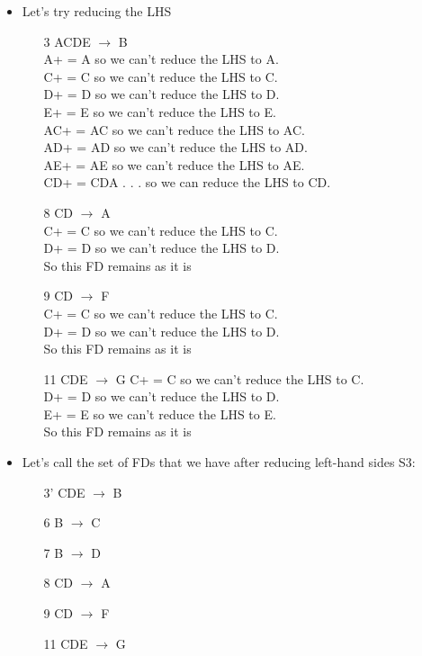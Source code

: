 \documentclass{article}
\begin{document}
\begin{enumerate}
\begin{enumerate}
\begin{itemize}
\item %
Let's try reducing the LHS
\begin{enumerate} 
\item[3] ACDE $\rightarrow$ B \\
A+ = A so we can't reduce the LHS to A. \\
C+ = C so we can't reduce the LHS to C. \\
D+ = D so we can't reduce the LHS to D. \\
E+ = E so we can't reduce the LHS to E. \\
AC+ = AC so we can't reduce the LHS to AC. \\
AD+ = AD so we can't reduce the LHS to AD. \\
AE+ = AE so we can't reduce the LHS to AE. \\
CD+ = CDA . . . so we can reduce the LHS to CD. 
\item[8] CD $\rightarrow$ A \\
C+ = C so we can't reduce the LHS to C. \\
D+ = D so we can't reduce the LHS to D. \\
So this FD remains as it is
\item[9] CD $\rightarrow$ F \\
C+ = C so we can't reduce the LHS to C. \\
D+ = D so we can't reduce the LHS to D. \\
So this FD remains as it is
\item[11] CDE $\rightarrow$ G
C+ = C so we can't reduce the LHS to C. \\
D+ = D so we can't reduce the LHS to D. \\
E+ = E so we can't reduce the LHS to E. \\
So this FD remains as it is
\end{enumerate}

\item %
Let's call the set of FDs that we have after reducing left-hand sides S3:
\begin{enumerate} 
\item[3'] CDE $\rightarrow$ B
\item[6] B $\rightarrow$ C
\item[7] B $\rightarrow$ D
\item[8] CD $\rightarrow$ A
\item[9] CD $\rightarrow$ F
\item[11] CDE $\rightarrow$ G
\end{enumerate}


\end{itemize}
\end{enumerate}
\end{enumerate}
\end{document}

